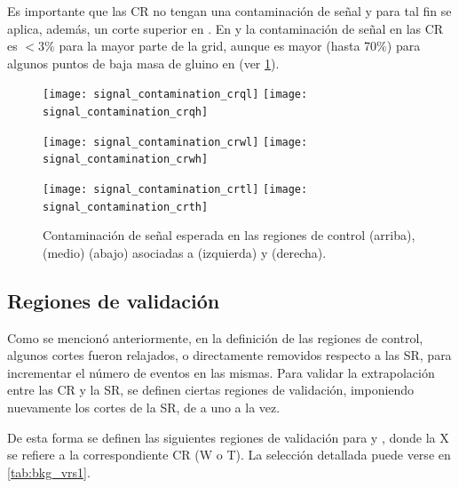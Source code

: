 
Es importante que las CR no tengan una contaminación de señal y para tal fin se aplica, además,
un corte superior en {\met}. En {\CRW} y
{\CRT} la contaminación de señal en las CR es $<3\%$ para la mayor parte de la
grid, aunque es mayor (hasta 70\%) para algunos puntos de baja masa de gluino en
{\CRTL} (ver \cref{fig:bkg_cr_contamination}).


\begin{figure}[!htbp]
  \centering

  \texttt{[image: signal\_contamination\_crql]}
  \texttt{[image: signal\_contamination\_crqh]}

  \texttt{[image: signal\_contamination\_crwl]}
  \texttt{[image: signal\_contamination\_crwh]}

  \texttt{[image: signal\_contamination\_crtl]}
  \texttt{[image: signal\_contamination\_crth]}


  \caption{Contaminación de señal esperada en las regiones de control {\CRQ} (arriba), {\CRW} (medio) {\CRT} (abajo) asociadas a {\SRL} (izquierda) y {\SRH} (derecha).}
  \label{fig:bkg_cr_contamination}
\end{figure}



\subsection{Regiones de validación}

Como se mencionó anteriormente, en la definición de las regiones de control,
algunos cortes fueron relajados, o directamente removidos respecto a las SR,
para incrementar el número de eventos en las mismas. Para validar la
extrapolación entre las CR y la SR, se definen ciertas regiones de validación,
imponiendo nuevamente los cortes de la SR, de a uno a la vez.

De esta forma se definen las siguientes regiones de validación para {\CRW} y
{\CRT}, donde la X se refiere a la correspondiente CR (W o T). La selección
detallada puede verse en \cref{tab:bkg_vrs1}.

